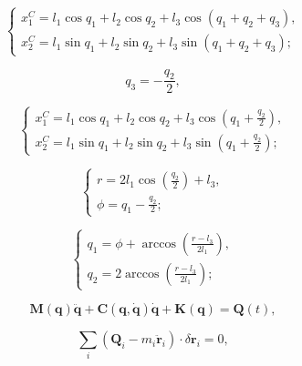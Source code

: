 \documentclass[conference]{IEEEtran}
\begin{document}
\begin{equation}
\begin{cases}
    x_{1}^C = l_1 \cos{q_1} + l_2 \cos{q_2} + l_3 \cos(q_1 + q_2 + q_3), \\
    x_{2}^C = l_1 \sin{q_1} + l_2 \sin{q_2} + l_3 \sin(q_1 + q_2 + q_3);
\end{cases}
\label{eq:x1_and_x2_equations_1}
\end{equation}

\begin{equation}
    q_3 = -\frac{q_2}{2},
\label{eq:q2_and_q3_relation}
\end{equation}

\begin{equation}
\begin{cases}
    x_{1}^C = l_1 \cos{q_1} + l_2 \cos{q_2} + l_3 \cos\left(q_1 + \frac{q_2}{2}\right), \\
    x_{2}^C = l_1 \sin{q_1} + l_2 \sin{q_2} + l_3 \sin\left(q_1 + \frac{q_2}{2}\right);
\end{cases}
\label{eq:x1_and_x2_equations_2}
\end{equation}

\begin{equation}
\begin{cases}
    r = 2l_1 \cos\left(\frac{q_2}{2}\right) + l_3, \\
    \phi = q_1 - \frac{q_2}{2};
\end{cases}
\label{eq:r_phi}
\end{equation}

\begin{equation}
\begin{cases}
    q_1 = \phi + \arccos\left(\frac{r - l_3}{2l_1}\right), \\
    q_2 = 2 \arccos\left(\frac{r - l_3}{2l_1}\right); %
\end{cases}
\label{eq:inverse_kinematics}
\end{equation}

\begin{equation}
\mathbf{M}(\mathbf{q}) \ddot{\mathbf{q}} + \mathbf{C}(\mathbf{q}, \dot{\mathbf{q}}) \dot{\mathbf{q}} + \mathbf{K}(\mathbf{q}) = \mathbf{Q}(t),
\label{eq:motion}
\end{equation}

\begin{equation}
\sum_i \left( \mathbf{Q}_i - m_i \ddot{\mathbf{r}}_i \right) \cdot \delta \mathbf{r}_i = 0,
\label{eq:dynamics}
\end{equation}
\end{document}
